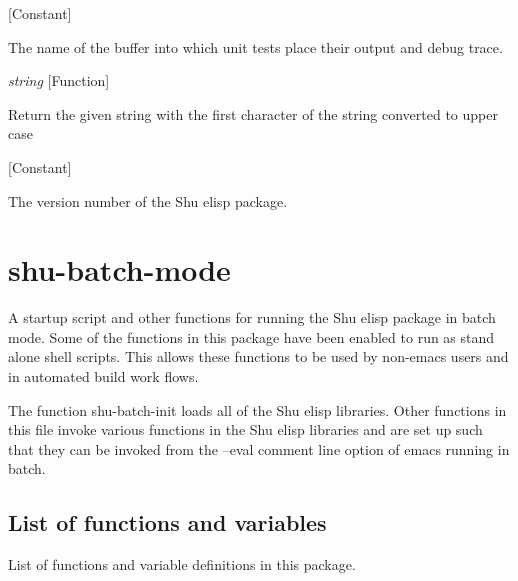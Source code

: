 \vspace{1em}
\noindent
{}
\usebox{\funcname}
 \hfill [Constant]

\begin{doc-string}
The name of the buffer into which unit tests place their output and
debug trace.
\end{doc-string}

\vspace{1em}
\noindent
{}
\usebox{\funcname}\emph{string}
 \hfill [Function]

\begin{doc-string}
Return the given string with the first character of the string converted
to upper case
\end{doc-string}

\vspace{1em}
\noindent
{}
\usebox{\funcname}
 \hfill [Constant]

\begin{doc-string}
The version number of the Shu elisp package.
\end{doc-string}

\eject
\section{shu-batch-mode}


A startup script and other functions for running the Shu elisp package
in batch mode.  Some of the functions in this package have been
enabled to run as stand alone shell scripts.  This allows these
functions to be used by non-emacs users and in automated build
work flows.

The function shu-batch-init loads all of the Shu elisp libraries.
Other functions in this file invoke various functions in the Shu
elisp libraries and are set up such that they can be invoked from
the --eval comment line option of emacs running in batch.


\subsection{List of functions and variables}

List of functions and variable definitions in this package.



